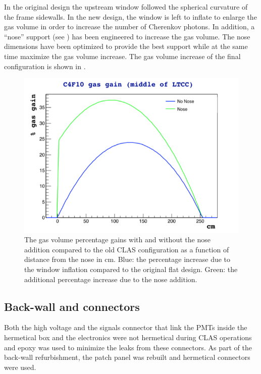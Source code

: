 In the original design the upstream window followed the spherical curvature of the frame sidewalls. In the new design, the window is left to inflate
to enlarge the gas volume in order to increase the number of Cherenkov photons. In addition, a ``nose'' support (see ) has been engineered to
increase the gas volume.
The nose dimensions have been optimized to provide the best support while at the same time maximize the gas volume increase. The gas volume increase
of the final configuration is shown in .


\begin{figure}
	\centering
	\includegraphics[width=0.95\columnwidth,keepaspectratio]{img/noseVolume.png}
	\caption{The gas volume percentage gains with and without the nose addition compared to the old CLAS configuration as a function of
            distance from the nose in cm. Blue: the percentage increase due to the window inflation compared to the original flat design.
            Green: the additional percentage increase due to the nose addition.}
	\label{fig:noseVolume}
\end{figure}


\subsection{Back-wall and connectors}

Both the high voltage and the signals connector that link the PMTs inside the hermetical box and the electronics were not
hermetical during CLAS operations and epoxy was used to minimize the leaks from these connectors.
As part of the back-wall refurbishment, the patch panel was rebuilt and hermetical connectors were used.

